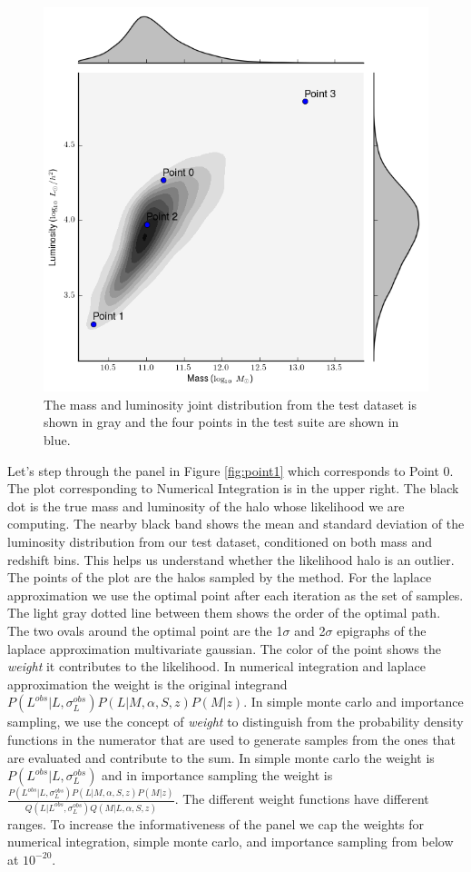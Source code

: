 \documentclass[\docopts]{\docclass}
\begin{document}
\begin{figure}[!h]
\centering
\includegraphics[width=0.9\columnwidth]{joint.png}
\caption{
The mass and luminosity joint distribution from the test dataset is shown in gray and the four points in the test suite are shown in blue. 
\label{fig:joint}}
\end{figure}

Let's step through the panel in Figure \ref{fig:point1} which corresponds to Point 0.
The plot corresponding to Numerical Integration is in the upper right.
The black dot is the true mass and luminosity of the halo whose likelihood we are computing.
The nearby black band shows the mean and standard deviation of the luminosity distribution from our test dataset, conditioned on both mass and redshift bins.
This helps us understand whether the likelihood halo is an outlier.
The points of the plot are the halos sampled by the method.
For the laplace approximation we use the optimal point after each iteration as the set of samples.
The light gray dotted line between them shows the order of the optimal path. 
The two ovals around the optimal point are the 1$\sigma$ and 2$\sigma$ epigraphs of the laplace approximation multivariate gaussian.
The color of the point shows the \emph{weight} it contributes to the likelihood.
In numerical integration and laplace approximation the weight is the original integrand $P(L^{obs}|L, \sigma_L^{obs})P(L|M, \alpha, S, z)P(M|z)$.
In simple monte carlo and importance sampling, we use the concept of \emph{weight} to distinguish from the probability density functions in the numerator that are used to generate samples from the ones that are evaluated and contribute to the sum.
In simple monte carlo the weight is $P(L^{obs}|L, \sigma_L^{obs})$ and in importance sampling the weight is $\frac{P(L^{obs}|L, \sigma_L^{obs})P(L|M, \alpha, S, z)P(M|z)}{Q(L|L^{obs}, \sigma_L^{obs})Q(M|L,\alpha, S, z)}$.
The different weight functions have different ranges.
To increase the informativeness of the panel we cap the weights for numerical integration, simple monte carlo, and importance sampling from below at $10^{-20}$. 
\end{document}
